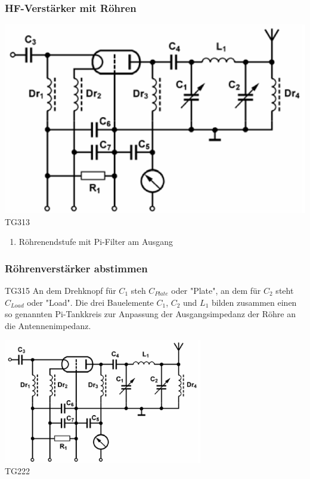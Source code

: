 \begin{frame}
    \frametitle{HF-Verstärker mit Röhren}
    \begin{center}
        \includegraphics[width=1\textwidth]{a07/TG313.png}\\
        \tiny TG313 \hyperlink{refs}{\cite{bna}}
     	\begin{enumerate} \Large
			\item Röhrenendstufe mit Pi-Filter am Ausgang
    	\end{enumerate}
    \end{center}
\end{frame}

\begin{frame}
    \frametitle{Röhrenverstärker abstimmen}
    \begin{center} \Large
        \begin{block}{TG315}
		\large An dem Drehknopf für $C_1$ steh $C_{Plate}$ oder "Plate", an dem für $C_2$ steht $C_{Load}$ oder "Load". Die drei Bauelemente $C_1$, $C_2$ und $L_1$ bilden zusammen einen so genannten Pi-Tankkreis zur Anpassung der Ausgangsimpedanz der Röhre an die Antennenimpedanz.\\
    	\end{block}
        \includegraphics[width=0.65\textwidth]{a07/TG313.png}\\
        \tiny TG222 \hyperlink{refs}{\cite{bna}}
    \end{center}
\end{frame}

